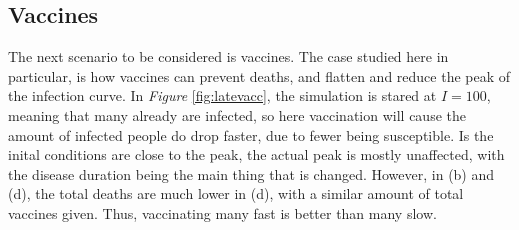 \subsection{Vaccines}
The next scenario to be considered is vaccines. The case studied here in particular, is how vaccines can prevent deaths, and flatten and reduce the peak of the infection curve.
In \textit{Figure} \ref{fig:latevacc}, the simulation is stared at $I=100$, meaning that many already are infected, so here vaccination will cause the amount of infected people do drop faster, due to fewer being susceptible.
Is the inital conditions are close to the peak, the actual peak is mostly unaffected, with the disease duration being the main thing that is changed.
However, in (b) and (d), the total deaths are much lower in (d), with a similar amount of total vaccines given. Thus, vaccinating many fast is better than many slow.
